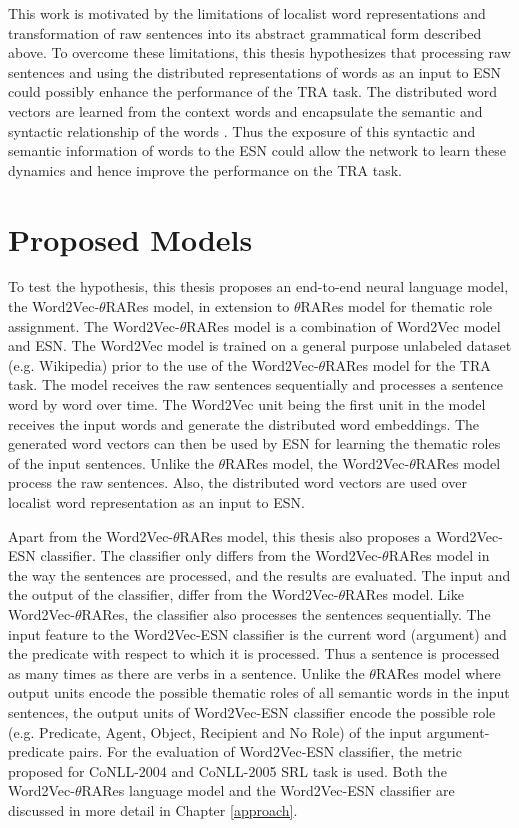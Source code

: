 This work is motivated by the limitations of localist word representations and transformation of raw sentences into its abstract grammatical form described above. To overcome these limitations, this thesis hypothesizes that processing raw sentences and using the distributed representations of words as an input to ESN could possibly enhance the performance of the TRA task. The distributed word vectors are learned from the context words and encapsulate the semantic and syntactic relationship of the words \cite{w2v:mikolov_2013_distributed}. Thus the exposure of this syntactic and semantic information of words to the ESN could allow the network to learn these dynamics and hence improve the performance on the TRA task.  

\section{Proposed Models}

To test the hypothesis, this thesis proposes an end-to-end neural language model, the Word2Vec-$\theta$RARes model, in extension to $\theta$RARes model for thematic role assignment. The Word2Vec-$\theta$RARes model is a combination of Word2Vec model and \acs{ESN}. The Word2Vec model is trained on a general purpose unlabeled dataset (e.g. Wikipedia) prior to the use of the Word2Vec-$\theta$RARes model for the TRA task. The model receives the raw sentences sequentially and processes a sentence word by word over time. The Word2Vec unit being the first unit in the model receives the input words and generate the distributed word embeddings. The generated word vectors can then be used by \acs{ESN} for learning the thematic roles of the input sentences. Unlike the $\theta$RARes model, the Word2Vec-$\theta$RARes model process the raw sentences. Also, the distributed word vectors are used over localist word representation as an input to \acs{ESN}. 

Apart from the Word2Vec-$\theta$RARes model, this thesis also proposes a Word2Vec-ESN classifier. The classifier only differs from the Word2Vec-$\theta$RARes model in the way the sentences are processed, and the results are evaluated. The input and the output of the classifier, differ from the Word2Vec-$\theta$RARes model. Like Word2Vec-$\theta$RARes, the classifier also processes the sentences sequentially. The input feature to the Word2Vec-ESN classifier is the current word (argument) and the predicate with respect to which it is processed. Thus a sentence is processed as many times as there are verbs in a sentence. Unlike the $\theta$RARes model where output units encode the possible thematic roles of all semantic words in the input sentences, the output units of Word2Vec-ESN classifier encode the possible role (e.g. Predicate, Agent, Object, Recipient and No Role) of the input argument-predicate pairs. For the evaluation of Word2Vec-ESN classifier, the metric proposed for CoNLL-2004 \cite{conll:2004} and CoNLL-2005 \cite{conll:2005} \acs{SRL} task is used. Both the Word2Vec-$\theta$RARes language model and the Word2Vec-ESN classifier are discussed in more detail in Chapter \ref{approach}.

